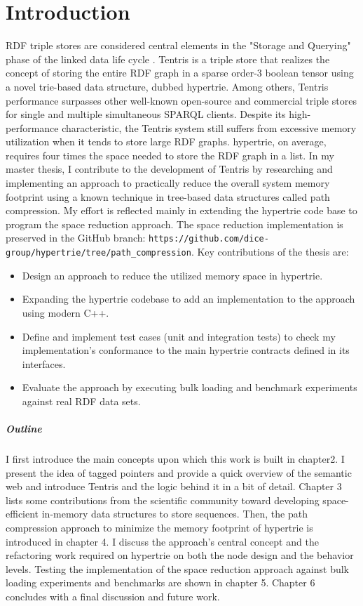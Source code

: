 \chapter{Introduction}
\label{ch:introduction}
RDF triple stores are considered central elements in the "Storage and Querying" phase of the linked data life cycle \cite{axel}.
Tentris is a triple store that realizes the concept of storing the entire RDF graph in a sparse order-3 boolean tensor using a novel trie-based data structure, dubbed hypertrie.
Among others, Tentris performance surpasses other well-known open-source and commercial triple stores \cite{tentris2020} for single and multiple simultaneous SPARQL clients. Despite its high-performance characteristic, the Tentris system still suffers from excessive memory utilization when it tends to store large RDF graphs. hypertrie, on average, requires four times the space needed to store the RDF graph in a list. In my master thesis, I contribute to the development of Tentris by researching and implementing an approach to practically reduce the overall system memory footprint using a known technique in tree-based data structures called path compression. My effort is reflected mainly in extending the hypertrie code base to program the space reduction approach. The space reduction implementation is preserved in the GitHub branch: \verb|https://github.com/dice-group/hypertrie/tree/path_compression|. Key contributions of the thesis are:
\begin{itemize}
	\item Design an approach to reduce the utilized memory space in hypertrie.
	\item Expanding the hypertrie codebase to add an implementation to the approach using modern C++.
	\item Define and implement test cases (unit and integration tests) to check my implementation's conformance to the main hypertrie contracts defined in its interfaces.
	\item Evaluate the approach by executing bulk loading and benchmark experiments against real RDF data sets.
\end{itemize}


\paragraph{Outline} I first introduce the main concepts upon which this work is built in chapter2. I present the idea of tagged pointers and provide a quick overview of the semantic web and introduce Tentris and the logic behind it in a bit of detail. Chapter 3 lists some contributions from the scientific community toward developing space-efficient in-memory data structures to store sequences. Then, the path compression approach to minimize the memory footprint of hypertrie is introduced in chapter 4. I discuss the approach's central concept and the refactoring work required on hypertrie on both the node design and the behavior levels. Testing the implementation of the space reduction approach against bulk loading experiments and benchmarks are shown in chapter 5. Chapter 6 concludes with a final discussion and future work. 
